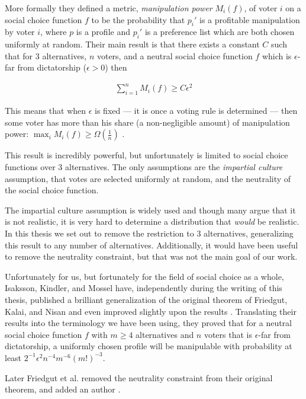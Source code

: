 	More formally they defined a metric, \emph{manipulation power} $M_i(f)$, of voter $i$ on a social choice function $f$ to be the probability that $p_i'$ is a profitable manipulation by voter $i$, where $p$ is a profile and $p_i'$ is a preference list which are both chosen uniformly at random. Their main result is that there exists a constant $C$ such that for 3 alternatives, $n$ voters, and a neutral social choice function $f$ which is $\epsilon$-far from dictatorship ($\epsilon > 0$) then

	\begin{align*}
		\sum_{i=1}^n M_i(f) \ge C \epsilon^2
	\end{align*}

	This means that when $\epsilon$ is fixed --- it is once a voting rule is determined --- then some voter has more than his share (a non-negligible amount) of manipulation power: $\max_i M_i(f) \ge \Omega(\frac{1}{n})$ \cite{friedgut2008elections}.

	This result is incredibly powerful, but unfortunately is limited to social choice functions over 3 alternatives. The only assumptions are the \emph{impartial culture} assumption, that votes are selected uniformly at random, and the neutrality of the social choice function.

	The impartial culture assumption is widely used and though many argue that it is not realistic, it is very hard to determine a distribution that \emph{would} be realistic. In this thesis we set out to remove the restriction to 3 alternatives, generalizing this result to any number of alternatives. Additionally, it would have been useful to remove the neutrality constraint, but that was not the main goal of our work.

	Unfortunately for us, but fortunately for the field of social choice as a whole, Isaksson, Kindler, and Mossel have, independently during the writing of this thesis, published a brilliant generalization of the original theorem of Friedgut, Kalai, and Nisan and even improved slightly upon the results \cite{isaksson2010geometry}. Translating their results into the terminology we have been using, they proved that for a neutral social choice function $f$ with $m \ge 4$ alternatives and $n$ voters that is $\epsilon$-far from dictatorship, a uniformly chosen profile will be manipulable with probability at least $2^{-1} \epsilon^2 n^{-4} m^{-6} (m!)^{-3}$.

	Later Friedgut et al. removed the neutrality constraint from their original theorem, and added an author \cite{friedgut2011quantitative}.

